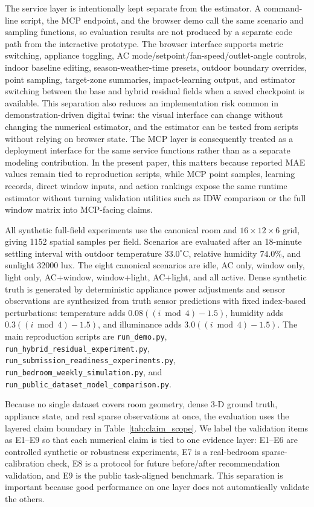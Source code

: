 \documentclass[conference]{IEEEtran}
\begin{document}
The service layer is intentionally kept separate from the estimator. A command-line script, the MCP endpoint, and the browser demo call the same scenario and sampling functions, so evaluation results are not produced by a separate code path from the interactive prototype. The browser interface supports metric switching, appliance toggling, AC mode/setpoint/fan-speed/outlet-angle controls, indoor baseline editing, season-weather-time presets, outdoor boundary overrides, point sampling, target-zone summaries, impact-learning output, and estimator switching between the base and hybrid residual fields when a saved checkpoint is available.
This separation also reduces an implementation risk common in demonstration-driven digital twins: the visual interface can change without changing the numerical estimator, and the estimator can be tested from scripts without relying on browser state. The MCP layer is consequently treated as a deployment interface for the same service functions rather than as a separate modeling contribution. In the present paper, this matters because reported MAE values remain tied to reproduction scripts, while MCP point samples, learning records, direct window inputs, and action rankings expose the same runtime estimator without turning validation utilities such as IDW comparison or the full window matrix into MCP-facing claims.

All synthetic full-field experiments use the canonical room and $16\times12\times6$ grid, giving 1152 spatial samples per field. Scenarios are evaluated after an 18-minute settling interval with outdoor temperature $33.0^\circ$C, relative humidity $74.0\%$, and sunlight 32000 lux. The eight canonical scenarios are idle, AC only, window only, light only, AC+window, window+light, AC+light, and all active. Dense synthetic truth is generated by deterministic appliance power adjustments and sensor observations are synthesized from truth sensor predictions with fixed index-based perturbations: temperature adds $0.08((i\bmod4)-1.5)$, humidity adds $0.3((i\bmod4)-1.5)$, and illuminance adds $3.0((i\bmod4)-1.5)$. The main reproduction scripts are \texttt{run\_demo.py}, \texttt{run\_hybrid\_residual\_experiment.py}, \texttt{run\_submission\_readiness\_experiments.py}, \texttt{run\_bedroom\_weekly\_simulation.py}, and \texttt{run\_public\_dataset\_model\_comparison.py}.

Because no single dataset covers room geometry, dense 3-D ground truth, appliance state, and real sparse observations at once, the evaluation uses the layered claim boundary in Table~\ref{tab:claim_scope}. We label the validation items as E1--E9 so that each numerical claim is tied to one evidence layer: E1--E6 are controlled synthetic or robustness experiments, E7 is a real-bedroom sparse-calibration check, E8 is a protocol for future before/after recommendation validation, and E9 is the public task-aligned benchmark. This separation is important because good performance on one layer does not automatically validate the others.
\end{document}
